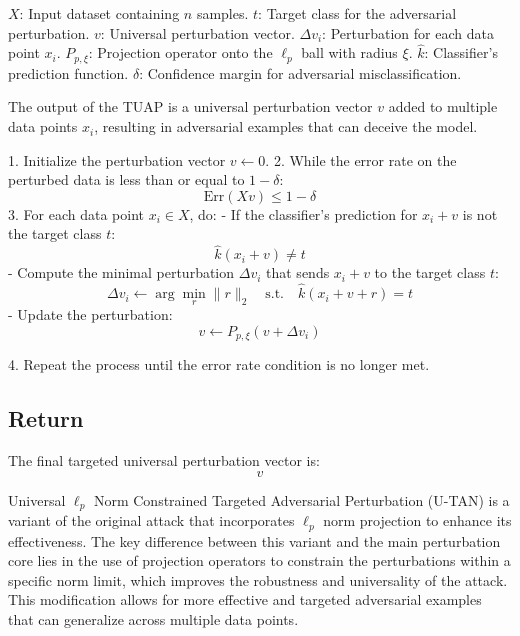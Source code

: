 $X$: Input dataset containing $n$ samples.
$t$: Target class for the adversarial perturbation.
$v$: Universal perturbation vector.
$\Delta v_i$: Perturbation for each data point $x_i$.
$P_{p, \xi}$: Projection operator onto the $\ell_p$ ball with radius $\xi$.
$\hat{k}$: Classifier's prediction function.
$\delta$: Confidence margin for adversarial misclassification.


The output of the TUAP is a universal perturbation vector $v$ added to multiple data points $x_i$, resulting in adversarial examples that can deceive the model.

1. Initialize the perturbation vector $v \leftarrow 0$.
2. While the error rate on the perturbed data is less than or equal to $1 - \delta$:
\[
\text{Err}(Xv) \leq 1 - \delta
\]
3. For each data point $x_i \in X$, do:
    - If the classifier's prediction for $x_i + v$ is not the target class $t$:
        \[
        \hat{k}(x_i + v) \neq t
        \]
            - Compute the minimal perturbation $\Delta v_i$ that sends $x_i + v$ to the target class $t$:
            \[
            \Delta v_i \leftarrow \arg \min_{r} \|r\|_2 \quad \text{s.t.} \quad \hat{k}(x_i + v + r) = t
            \]
            - Update the perturbation:
            \[
            v \leftarrow P_{p, \xi}(v + \Delta v_i)
            \]

4. Repeat the process until the error rate condition is no longer met.

\subsection*{Return}
The final targeted universal perturbation vector is:
\[
v
\]

Universal $\ell_p$ Norm Constrained Targeted Adversarial Perturbation (U-TAN) is a variant of the original attack that incorporates $\ell_p$ norm projection to enhance its effectiveness. The key difference between this variant and the main perturbation core lies in the use of projection operators to constrain the perturbations within a specific norm limit, which improves the robustness and universality of the attack. This modification allows for more effective and targeted adversarial examples that can generalize across multiple data points.